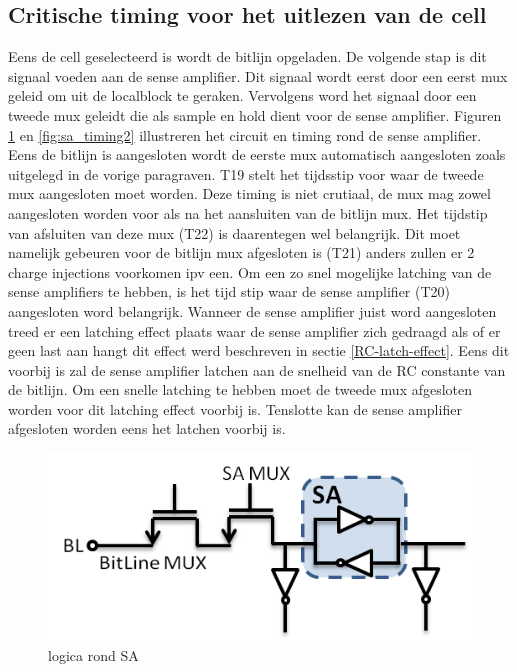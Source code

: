 \subsection{Critische timing voor het uitlezen van de cell}
Eens de cell geselecteerd is wordt de bitlijn opgeladen. De volgende stap is dit signaal voeden aan de sense amplifier. Dit signaal wordt eerst door een eerst mux geleid om uit de localblock te geraken. Vervolgens word het signaal door een tweede mux geleidt die als sample en hold dient voor de sense amplifier. Figuren \ref{fig:sa_timing1} en \ref{fig:sa_timing2} illustreren het circuit en timing rond de sense amplifier. Eens de bitlijn is aangesloten wordt de eerste mux automatisch aangesloten zoals uitgelegd in de vorige paragraven. T19 stelt het tijdsstip voor waar de tweede mux aangesloten moet worden. Deze timing is niet crutiaal, de mux mag zowel aangesloten worden voor als na het aansluiten van de bitlijn mux. Het tijdstip van afsluiten van deze mux (T22) is daarentegen wel belangrijk. Dit moet namelijk gebeuren voor de bitlijn mux afgesloten is (T21) anders zullen er 2 charge injections voorkomen ipv een. Om een zo snel mogelijke latching van de sense amplifiers te hebben, is het tijd stip waar de sense amplifier (T20) aangesloten word belangrijk. Wanneer de sense amplifier juist word aangesloten treed er een latching effect plaats waar de sense amplifier zich gedraagd als of er geen last aan hangt dit effect werd beschreven in sectie \ref{RC-latch-effect}. Eens dit voorbij is zal de sense amplifier latchen aan de snelheid van de RC constante van de bitlijn. Om een snelle latching te hebben moet de tweede mux afgesloten worden voor dit latching effect voorbij is.
Tenslotte kan de sense amplifier afgesloten worden eens het latchen voorbij is.

\begin{figure}[!ht]
  \centering
  \includegraphics[scale=0.6]{../fig/hfdstk-timing-sa1.png}
  \caption{logica rond SA}
  \label{fig:sa_timing1}
\end{figure}

